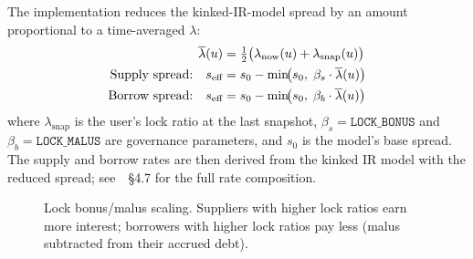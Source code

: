 \documentclass[10pt,a4paper,twocolumn]{article}
\begin{document}
The implementation reduces the kinked-IR-model spread by an amount proportional to a time-averaged $\lambda$:
\begin{align}
\overline{\lambda}(u)            &= \tfrac{1}{2}\bigl(\lambda_{\text{now}}(u) + \lambda_{\text{snap}}(u)\bigr) \notag\\
\text{Supply spread:} \quad s_{\text{eff}} &= s_0 - \min\!\bigl(s_0,\;\beta_s \cdot \overline{\lambda}(u)\bigr) \label{eq:supply-bonus} \\
\text{Borrow spread:} \quad s_{\text{eff}} &= s_0 - \min\!\bigl(s_0,\;\beta_b \cdot \overline{\lambda}(u)\bigr) \label{eq:borrow-malus}
\end{align}
where $\lambda_{\text{snap}}$ is the user's lock ratio at the last snapshot, $\beta_s = \texttt{LOCK\_BONUS}$ and $\beta_b = \texttt{LOCK\_MALUS}$ are governance parameters, and $s_0$ is the model's base spread. The supply and borrow rates are then derived from the kinked IR model with the reduced spread; see~\cite{wp}~\S4.7 for the full rate composition.

\begin{figure}[htbp]
\centering
{}
\caption{Lock bonus/malus scaling. Suppliers with higher lock ratios earn more interest; borrowers with higher lock ratios pay less (malus subtracted from their accrued debt).}
\label{fig:lock-bonus}
\end{figure}
\end{document}
